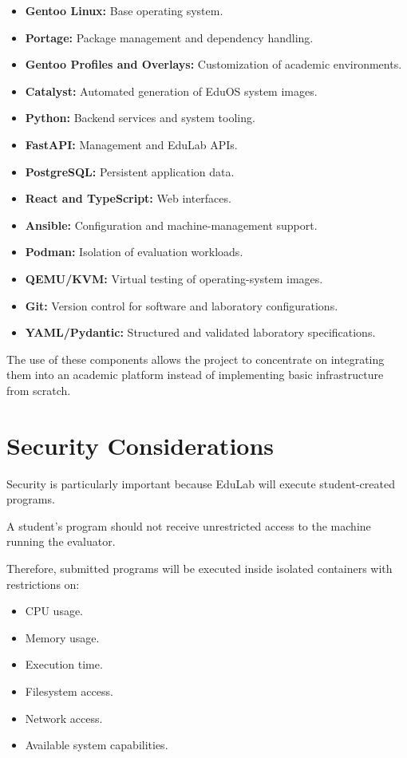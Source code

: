 \documentclass[12pt,a4paper]{article}
\begin{document}
\begin{itemize}
    \item \textbf{Gentoo Linux:} Base operating system.
    \item \textbf{Portage:} Package management and dependency handling.
    \item \textbf{Gentoo Profiles and Overlays:} Customization of academic environments.
    \item \textbf{Catalyst:} Automated generation of EduOS system images.
    \item \textbf{Python:} Backend services and system tooling.
    \item \textbf{FastAPI:} Management and EduLab APIs.
    \item \textbf{PostgreSQL:} Persistent application data.
    \item \textbf{React and TypeScript:} Web interfaces.
    \item \textbf{Ansible:} Configuration and machine-management support.
    \item \textbf{Podman:} Isolation of evaluation workloads.
    \item \textbf{QEMU/KVM:} Virtual testing of operating-system images.
    \item \textbf{Git:} Version control for software and laboratory configurations.
    \item \textbf{YAML/Pydantic:} Structured and validated laboratory specifications.
\end{itemize}

The use of these components allows the project to concentrate on integrating them into an academic platform instead of implementing basic infrastructure from scratch.

\section{Security Considerations}

Security is particularly important because EduLab will execute student-created programs.

A student's program should not receive unrestricted access to the machine running the evaluator.

Therefore, submitted programs will be executed inside isolated containers with restrictions on:

\begin{itemize}
    \item CPU usage.
    \item Memory usage.
    \item Execution time.
    \item Filesystem access.
    \item Network access.
    \item Available system capabilities.
\end{itemize}
\end{document}
